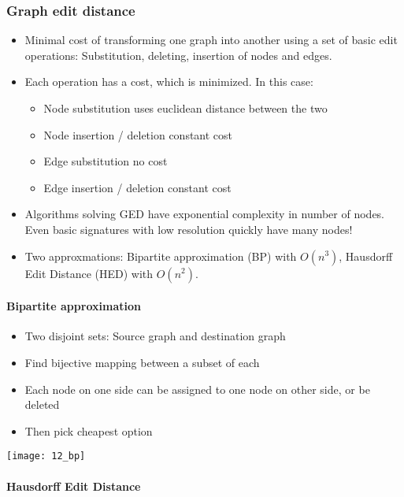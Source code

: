 \subsubsection{Graph edit distance}

\begin{itemize}
		\item Minimal cost of transforming one graph into another using a set
				of basic edit operations: Substitution, deleting, insertion of
				nodes and edges.
		\item Each operation has a cost, which is minimized. In this case:
				\begin{itemize}
						\item Node substitution uses euclidean distance between the two
						\item Node insertion / deletion constant cost
						\item Edge substitution no cost
						\item Edge insertion / deletion constant cost
				\end{itemize}
		\item Algorithms solving GED have exponential complexity in number of
				nodes. Even basic signatures with low resolution quickly have
				many nodes!
		\item Two approxmations: Bipartite approximation (BP) with $O(n^3)$,
				Hausdorff Edit Distance (HED) with $O(n^2)$.
\end{itemize}

\paragraph{Bipartite approximation}

\begin{itemize}
		\item Two disjoint sets: Source graph and destination graph
		\item Find bijective mapping between a subset of each
		\item Each node on one side can be assigned to one node on other side,
				or be deleted
		\item Then pick cheapest option
\end{itemize}

\texttt{[image: 12\_bp]}

\paragraph{Hausdorff Edit Distance}

